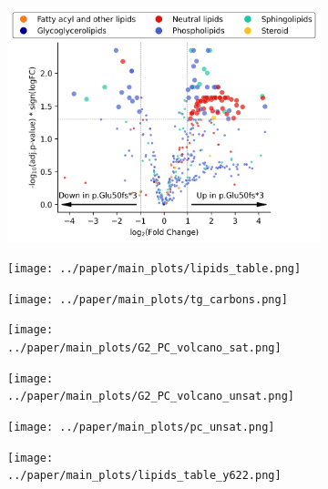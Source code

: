 \begin{figure}[H]
    \begin{subfigure}[t]{.3\textwidth}
        \caption{}
        \includegraphics[width=\textwidth]{../paper/main_plots/iN_lipids_overview.png}        
    \end{subfigure} 
    \begin{subfigure}[t]{.3\textwidth}
        \caption{}
        \texttt{[image: ../paper/main\_plots/lipids\_table.png]}        
    \end{subfigure} 
    \begin{subfigure}[t]{.3\textwidth}
        \caption{}
        \texttt{[image: ../paper/main\_plots/tg\_carbons.png]}        
    \end{subfigure} 
    \begin{subfigure}[t]{.3\textwidth}
        \caption{}
        \texttt{[image: ../paper/main\_plots/G2\_PC\_volcano\_sat.png]}        
    \end{subfigure} 
    \begin{subfigure}[t]{.3\textwidth}
        \caption{}
        \texttt{[image: ../paper/main\_plots/G2\_PC\_volcano\_unsat.png]}        
    \end{subfigure} 
    \begin{subfigure}[t]{.3\textwidth}
        \caption{}
        \texttt{[image: ../paper/main\_plots/pc\_unsat.png]}        
    \end{subfigure} 
    \begin{subfigure}[t]{.3\textwidth}
        \caption{}
        \texttt{[image: ../paper/main\_plots/lipids\_table\_y622.png]}        
    \end{subfigure}

\end{figure}
